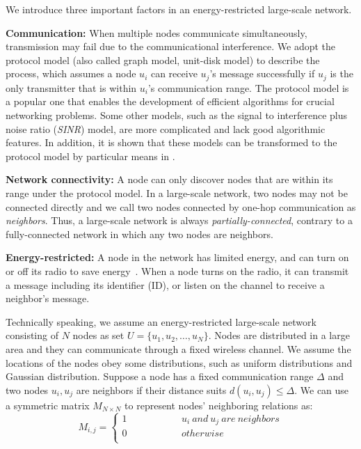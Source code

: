 We introduce three important factors in an energy-restricted large-scale network.

\textbf{Communication:}
When multiple nodes communicate simultaneously, transmission may fail due to the communicational interference. We adopt the protocol model (also called graph model, unit-disk model\cite{moscibroda2006complexity, wang2015connectivity}) to describe the process, which assumes a node $u_i$ can receive $u_j$'s message successfully if $u_j$ is the only transmitter that is within $u_i$'s communication range.
The protocol model is a popular one that enables the development of efficient algorithms for crucial networking problems. Some other models, such as the signal to interference plus noise ratio (\emph{SINR}) model, are more complicated and lack good algorithmic features. In addition, it is shown that these models can be transformed to the protocol model by particular means in \cite{lebhar2009unit}.

\textbf{Network connectivity:}
A node can only discover nodes that are within its range under the protocol model. In a large-scale network, two nodes may not be connected directly and we call two nodes connected by one-hop communication as \emph{neighbors}. Thus, a large-scale network is always \emph{partially-connected}, contrary to a fully-connected network in which any two nodes are neighbors.

\textbf{Energy-restricted:}
A node in the network has limited energy, and can turn on or off its radio to save energy~\cite{dunkels2011contikimac}. When a node turns on the radio, it can transmit a message including its identifier (ID), or listen on the channel to receive a neighbor's message.

Technically speaking, we assume an energy-restricted large-scale network consisting of $N$ nodes as set $U=\{u_1,u_2,\ldots,u_N\}$.  Nodes are distributed in a large area and they can communicate through a fixed wireless channel. We assume the locations of the nodes obey some distributions, such as uniform distributions and Gaussian distribution\cite{wang2013gaussian}.
Suppose a node has a fixed communication range $\Delta$ and two nodes $u_i, u_j$ are neighbors if their distance suits $d(u_i, u_j) \leq \Delta$. We can use a symmetric matrix $M_{N\times N}$ to represent nodes' neighboring relations as:
$$ M_{i,j}=\left\{
\begin{aligned}
1  & & & & & & &{u_i ~and~ u_j ~are~ neighbors}\\
0  & & & & & & &{otherwise}\\
\end{aligned}
\right.
$$


